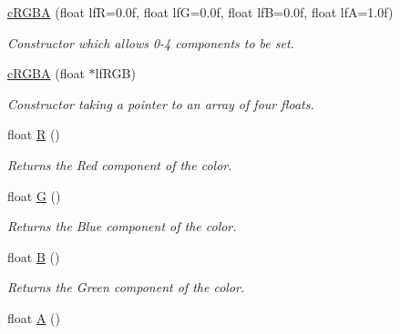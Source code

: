 \begin{DoxyCompactItemize}
\item 
\hypertarget{classc_r_g_b_a_a29ab987874e4fee0e66aa13bfa17a354}{
\hyperlink{classc_r_g_b_a_a29ab987874e4fee0e66aa13bfa17a354}{cRGBA} (float lfR=0.0f, float lfG=0.0f, float lfB=0.0f, float lfA=1.0f)}
\label{classc_r_g_b_a_a29ab987874e4fee0e66aa13bfa17a354}

\begin{DoxyCompactList}\small\item\em Constructor which allows 0-\/4 components to be set. \end{DoxyCompactList}\item 
\hypertarget{classc_r_g_b_a_a4df387999bb45a92c1ac4ec39585e58c}{
\hyperlink{classc_r_g_b_a_a4df387999bb45a92c1ac4ec39585e58c}{cRGBA} (float $\ast$lfRGB)}
\label{classc_r_g_b_a_a4df387999bb45a92c1ac4ec39585e58c}

\begin{DoxyCompactList}\small\item\em Constructor taking a pointer to an array of four floats. \end{DoxyCompactList}\item 
\hypertarget{classc_r_g_b_a_a4e9071d7007764db7114a2841608c7d9}{
float \hyperlink{classc_r_g_b_a_a4e9071d7007764db7114a2841608c7d9}{R} ()}
\label{classc_r_g_b_a_a4e9071d7007764db7114a2841608c7d9}

\begin{DoxyCompactList}\small\item\em Returns the Red component of the color. \end{DoxyCompactList}\item 
\hypertarget{classc_r_g_b_a_ad475dab144bb13a5ae4f39263783f357}{
float \hyperlink{classc_r_g_b_a_ad475dab144bb13a5ae4f39263783f357}{G} ()}
\label{classc_r_g_b_a_ad475dab144bb13a5ae4f39263783f357}

\begin{DoxyCompactList}\small\item\em Returns the Blue component of the color. \end{DoxyCompactList}\item 
\hypertarget{classc_r_g_b_a_aa2083970f51969b73f0d17ff3cbb64fa}{
float \hyperlink{classc_r_g_b_a_aa2083970f51969b73f0d17ff3cbb64fa}{B} ()}
\label{classc_r_g_b_a_aa2083970f51969b73f0d17ff3cbb64fa}

\begin{DoxyCompactList}\small\item\em Returns the Green component of the color. \end{DoxyCompactList}\item 
\hypertarget{classc_r_g_b_a_a2d3cd53de12cb0fc8a7d5fbf6806058d}{
float \hyperlink{classc_r_g_b_a_a2d3cd53de12cb0fc8a7d5fbf6806058d}{A} ()}
\label{classc_r_g_b_a_a2d3cd53de12cb0fc8a7d5fbf6806058d}


\end{DoxyCompactItemize}
